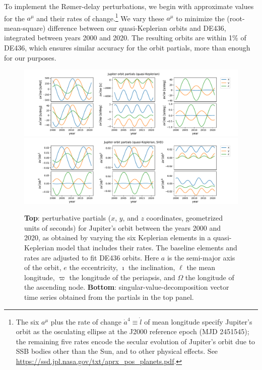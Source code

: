 \documentclass{aastex63}
\begin{document}
\begin{itemize}
To implement the R{\o}mer-delay perturbations, we begin with approximate values for the $a^\mu$ and their rates of change.\footnote{The six $a^\mu$ plus the rate of change $\dot{a}^4 \equiv \dot{l}$ of mean longitude specify Jupiter's orbit as the osculating ellipse at the J2000 reference epoch (MJD 2451545); the remaining five rates encode the secular evolution of Jupiter's orbit due to SSB bodies other than the Sun, and to other physical effects. See \href{https://ssd.jpl.nasa.gov/txt/aprx_pos_planets.pdf}{https://ssd.jpl.nasa.gov/txt/aprx\_pos\_planets.pdf}.}
We vary these $a^\mu$ to minimize the (root-mean-square) difference between our quasi-Keplerian orbits and DE436, integrated between years 2000 and 2020. The resulting orbits are within 1\% of DE436, which ensures similar accuracy for the orbit partials, more than enough for our purposes.
%
\begin{figure}[t]
    \centering
    \includegraphics[width=\columnwidth]{JupiterPartials.pdf}
    \includegraphics[width=\columnwidth]{JupiterPartialsSVD.pdf}
    \caption{\textbf{Top}: perturbative partials ($x$, $y$, and $z$ coordinates, geometrized units of seconds) for Jupiter's orbit between the years 2000 and 2020, as obtained by varying the six Keplerian elements in a quasi-Keplerian model that includes their rates. The baseline elements and rates are adjusted to fit DE436 orbits.
    Here $a$ is the semi-major axis of the orbit, $e$ the eccentricity, $\imath$ the inclination, $\ell$ the mean longitude, $\varpi$ the longitude of the periapsis, and $\Omega$ the longitude of the ascending node. 
    \textbf{Bottom}: singular-value-decomposition vector time series obtained from the partials in the top panel.}
    \label{fig:jupiterorbit}
\end{figure}


\end{itemize}
\end{document}
